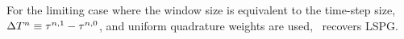 \begin{remark}
For the limiting case where the window size is equivalent to the time-step size, $\Delta T^{n} \equiv \tau^{n,1} - \tau^{n,0}$, and uniform 
quadrature weights are used, \methodAcronym\ recovers LSPG.
\end{remark} 

